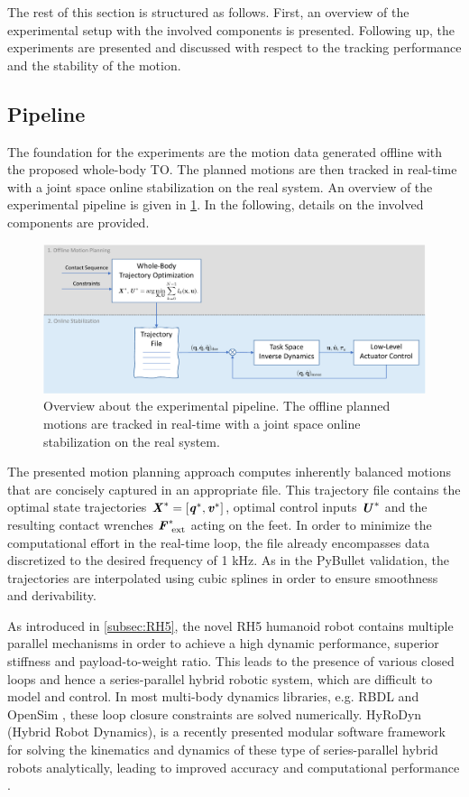 The rest of this section is structured as follows. First, an overview of the experimental setup with the involved components is presented. Following up, the experiments are presented and discussed with respect to the tracking performance and the stability of the motion.

\subsection{Pipeline}\label{subsec:Pipeline}
The foundation for the experiments are the motion data generated offline with the proposed whole-body \gls{TO}. The planned motions are then tracked in real-time with a joint space online stabilization on the real system. An overview of the experimental pipeline is given in \cref{img:experimentalSetup}. In the following, details on the involved components are provided. 
\begin{figure}
\centering	
\includegraphics[width=1\textwidth]{img/experimentalSetup2}
\caption[Overview about the experimental pipeline]{Overview about the experimental pipeline. The offline planned motions are tracked in real-time with a joint space online stabilization on the real system.}
\label{img:experimentalSetup}
\end{figure}
The presented motion planning approach computes inherently balanced motions that are concisely captured in an appropriate file. This trajectory file contains the optimal state trajectories $\bm{\mathit{X}}^*=[\bm{\mathit{q}}^*,\bm{\mathit{v}}^*]$, optimal control inputs $\bm{\mathit{U}}^*$ and the resulting contact wrenches $\bm{\mathit{F}}_{\text{ ext}}^*$ acting on the feet. In order to minimize the computational effort in the real-time loop, the file already encompasses data discretized to the desired frequency of 1 kHz. As in the PyBullet validation, the trajectories are interpolated using cubic splines in order to ensure smoothness and derivability. 

As introduced in \cref{subsec:RH5}, the novel RH5 humanoid robot contains multiple parallel mechanisms in order to achieve a high dynamic performance, superior stiffness and payload-to-weight ratio. This leads to the presence of various closed loops and hence a series-parallel hybrid robotic system, which are difficult to model and control. In most multi-body dynamics libraries, e.g. RBDL \cite{felis2017rbdl} and OpenSim \cite{delp2007opensim}, these loop closure constraints are solved numerically. HyRoDyn (Hybrid Robot Dynamics), is a recently presented modular software framework for solving the kinematics and dynamics of these type of series-parallel hybrid robots analytically, leading to improved accuracy and computational performance \cite{kumar2018hyrodyn}.

